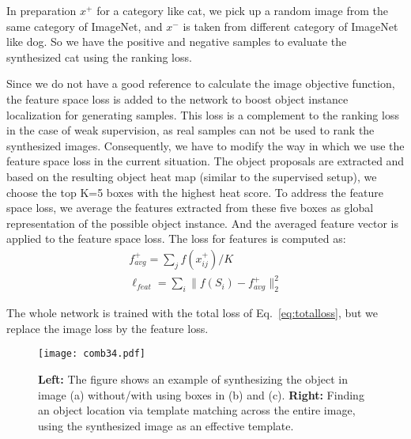 \documentclass[runningheads]{llncs}
\begin{document}
In preparation $x^+$ for a category like cat, we pick up a random image from the same category of ImageNet, and $x^-$ is taken from different category of ImageNet like dog. So we have the positive and negative samples to evaluate the synthesized cat using the ranking loss.

Since we do not have a good reference to calculate the image objective function, the feature space loss is added to the network to boost object instance localization for generating samples. This loss is a complement to the ranking loss in the case of weak supervision, as real samples can not be used to rank the synthesized images. Consequently, we have to modify the way in which we use the feature space loss in the current situation. The object proposals \cite{SS,edgebox} are extracted and based on the resulting object heat map (similar to the supervised setup), we choose the top K=5 boxes with the highest heat score. To address the feature space loss, we average the features extracted from these five boxes as global representation of the possible object instance. And the averaged feature vector is applied to the feature space loss. The loss for features is computed as:
\begin{equation}
\begin{split}
f_{avg}^+ = \sum_{j}{f(x_{ij}^+)} / K \qquad
\\
\ell_{feat} = \sum_{i}{\|f(S_{i}) - f_{avg}^+\|^2_2 }
\end{split}
\label{eq:1}
\end{equation}

\noindent The whole network is trained with the total loss of Eq.~\ref{eq:totalloss}, but we replace the image loss by the feature loss.


 
\begin{figure}[t]
\centering
{\texttt{[image: comb34.pdf]} 
} \caption{\textbf{Left:} The figure shows an example of synthesizing the object in image (a) without/with using boxes in (b) and (c). \textbf{Right:} Finding an object location via template matching across the entire image, using the synthesized image as an effective template.} 
\label{fig:tmpmatch&sample}
\end{figure}

\iffalse
 \begin{figure}[t]
\centering
{\texttt{[image: figs3.pdf]} 
} \caption{Finding an object location via template matching across the entire image, using the synthesized image as an effective template.
 } 
\label{fig:tmpmatch}
\end{figure}
\fi
\end{document}
